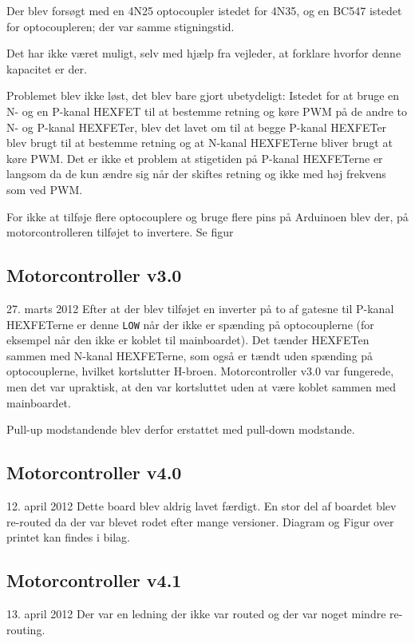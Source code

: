 \documentclass[a4paper,oneside,article,danish,table]{memoir}
\newcommand{\boarddate}[1]{\textcolor{blue!80!black}{#1}}
\begin{document}
Der blev forsøgt med en 4N25 optocoupler istedet for 4N35, og en BC547 istedet for optocoupleren; der var samme stigningstid.

Det har ikke været muligt, selv med hjælp fra vejleder, at forklare hvorfor denne kapacitet er der.

Problemet blev ikke løst, det blev bare gjort ubetydeligt: Istedet for at bruge en N- og en P-kanal HEXFET til at bestemme retning og køre PWM på de andre to N- og P-kanal HEXFETer, blev det lavet om til at begge P-kanal HEXFETer blev brugt til at bestemme retning og at N-kanal HEXFETerne bliver brugt at køre PWM. Det er ikke et problem at stigetiden på P-kanal HEXFETerne er langsom da de kun ændre sig når der skiftes retning og ikke med høj frekvens som ved PWM.

For ikke at tilføje flere optocouplere og bruge flere pins på Arduinoen blev der, på motorcontrolleren tilføjet to invertere. Se figur 
\subsection{Motorcontroller v3.0}
\boarddate{27. marts 2012}
Efter at der blev tilføjet en inverter på to af gatesne til P-kanal HEXFETerne er denne \texttt{LOW} når der ikke er spænding på optocouplerne (for eksempel når den ikke er koblet til mainboardet). Det tænder HEXFETen sammen med N-kanal HEXFETerne, som også er tændt uden spænding på optocouplerne, hvilket kortslutter H-broen. Motorcontroller v3.0 var fungerede, men det var upraktisk, at den var kortsluttet uden at være koblet sammen med mainboardet.

Pull-up modstandende blev derfor erstattet med pull-down modstande.
\subsection{Motorcontroller v4.0}
\boarddate{12. april 2012} Dette board blev aldrig lavet færdigt. 
En stor del af boardet blev re-routed da der var blevet rodet efter mange versioner. Diagram og Figur over printet kan findes i bilag. 

\subsection{Motorcontroller v4.1}
\boarddate{13. april 2012}
Der var en ledning der ikke var routed og der var noget mindre re-routing.
\end{document}
